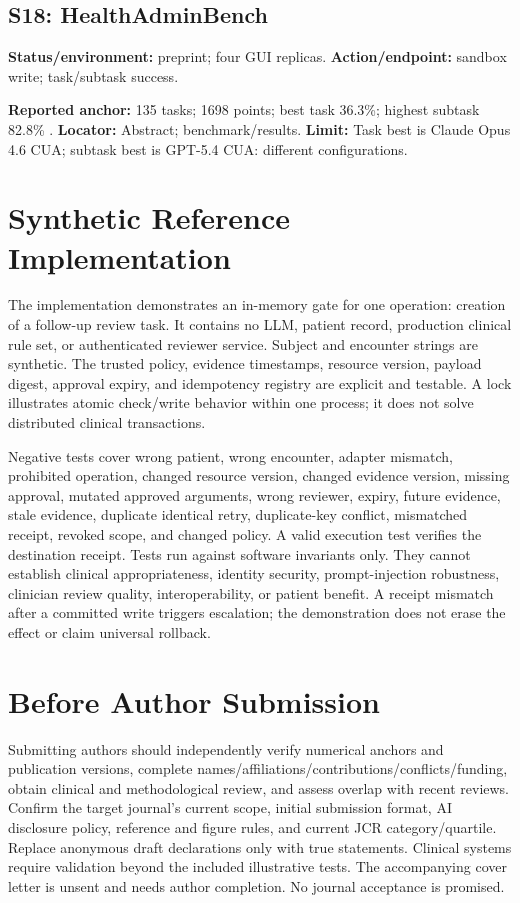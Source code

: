 \documentclass[journal,10pt]{IEEEtran}
\begin{document}
\subsection{S18: HealthAdminBench}
\textbf{Status/environment:} preprint; four GUI replicas. \textbf{Action/endpoint:} sandbox write; task/subtask success.

\textbf{Reported anchor:} 135 tasks; 1698 points; best task 36.3\%; highest subtask 82.8\% \cite{healthadmin2026}. \textbf{Locator:} Abstract; benchmark/results. \textbf{Limit:} Task best is Claude Opus 4.6 CUA; subtask best is GPT-5.4 CUA: different configurations.

\section{Synthetic Reference Implementation}
The implementation demonstrates an in-memory gate for one operation: creation of a follow-up review task. It contains no LLM, patient record, production clinical rule set, or authenticated reviewer service. Subject and encounter strings are synthetic. The trusted policy, evidence timestamps, resource version, payload digest, approval expiry, and idempotency registry are explicit and testable. A lock illustrates atomic check/write behavior within one process; it does not solve distributed clinical transactions.

Negative tests cover wrong patient, wrong encounter, adapter mismatch, prohibited operation, changed resource version, changed evidence version, missing approval, mutated approved arguments, wrong reviewer, expiry, future evidence, stale evidence, duplicate identical retry, duplicate-key conflict, mismatched receipt, revoked scope, and changed policy. A valid execution test verifies the destination receipt. Tests run against software invariants only. They cannot establish clinical appropriateness, identity security, prompt-injection robustness, clinician review quality, interoperability, or patient benefit. A receipt mismatch after a committed write triggers escalation; the demonstration does not erase the effect or claim universal rollback.

\section{Before Author Submission}
Submitting authors should independently verify numerical anchors and publication versions, complete names/affiliations/contributions/conflicts/funding, obtain clinical and methodological review, and assess overlap with recent reviews. Confirm the target journal's current scope, initial submission format, AI disclosure policy, reference and figure rules, and current JCR category/quartile. Replace anonymous draft declarations only with true statements. Clinical systems require validation beyond the included illustrative tests. The accompanying cover letter is unsent and needs author completion. No journal acceptance is promised.

\end{document}
